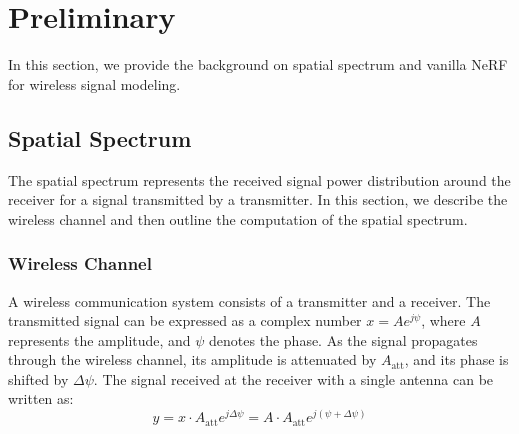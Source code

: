\section{Preliminary}\label{sec_motivation}

In this section, we provide the background on spatial spectrum and vanilla NeRF for wireless signal modeling.



\subsection{Spatial Spectrum}\label{sec_spatial_spectrum}
The spatial spectrum represents the received signal power distribution around the receiver for a signal transmitted by a transmitter. 
In this section, we describe the wireless channel and then outline the computation of the spatial spectrum.


\subsubsection{Wireless Channel}\label{sec_channel}
A wireless communication system consists of a transmitter and a receiver. 
The transmitted signal can be expressed as a complex number $x = A e^{j\psi}$, where $A$ represents the amplitude, and $\psi$ denotes the phase. 
As the signal propagates through the wireless channel, its amplitude is attenuated by $A_{\text{att}}$, and its phase is shifted by $\Delta \psi$. 
The signal received at the receiver with a single antenna can be written as:
\begin{equation}
y = x \cdot A_{\text{att}} e^{j\Delta \psi} = A \cdot A_{\text{att}} e^{j(\psi + \Delta \psi)}
\end{equation}




